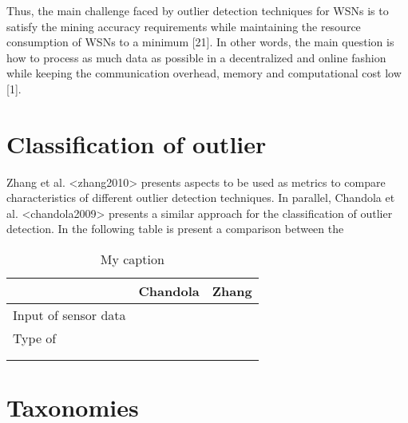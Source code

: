 \begin{framed}
	Thus, the main challenge faced by outlier detection techniques for WSNs is to satisfy the mining accuracy requirements while maintaining the resource consumption of WSNs
	to a minimum [21]. In other words, the main question is how to
	process as much data as possible in a decentralized and online
	fashion while keeping the communication overhead, memory
	and computational cost low [1].
\end{framed}


\section{Classification of outlier}

Zhang et al. <zhang2010> presents aspects to be used as metrics to compare characteristics of different outlier detection techniques. In parallel, Chandola et al. <chandola2009> presents a similar approach for the classification of outlier detection. In the following table is present a comparison between the 

\begin{table}[h!]
	\centering
	\caption{My caption}
	\label{my-label}
	\begin{tabular}{ l | l | l }
		& Chandola & Zhang \\ \hline
		Input of sensor data &          &       \\\hline
		Type of              &          &       \\
		&          &       \\
		&          &      
	\end{tabular}
\end{table}

\section{Taxonomies}
